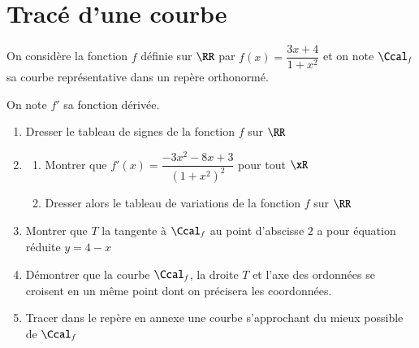 \documentclass[oneside,12pt]{article}
\begin{document}
\section{Tracé d'une courbe}
On considère la fonction $f$ définie sur $\RR$ par $f(x)=\dfrac{3x+4}{1+x^2}$ et on note $\Ccal_f$ sa courbe représentative dans un repère orthonormé.

On note $f'$ sa fonction dérivée.
\begin{enumerate}
	\item Dresser le tableau de signes de la fonction $f$ sur $\RR$
	\item \begin{enumerate}
		\item Montrer que $f'(x)=\dfrac{-3x^2-8x+3}{{(1+x^2)}^2}$ \quad pour tout $\xR$
		\item Dresser alors le tableau de variations de la fonction $f$ sur $\RR$
	\end{enumerate}
	\item Montrer que $T$ la tangente à $\Ccal_f$ au point d'abscisse $2$ a pour équation réduite $y=4-x$
	\item Démontrer que la courbe $\Ccal_f$, la droite $T$ et l'axe des ordonnées se croisent en un même point dont on précisera les coordonnées.
	\item Tracer dans le repère en annexe une courbe s'approchant du mieux possible de $\Ccal_f$
\end{enumerate}

\vspace{1cm}
\begin{center}
\end{center}
\end{document}
